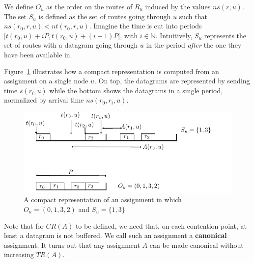 \documentclass[english]{article}
\begin{document}
We define $O_u$ as the order on the routes of $R_u$ induced by the values $ns(r,u)$. The set $S_u$ is defined as the set of routes going through $u$ such that $ns(r_0,r,u) < nt(r_0,r,u)$. Imagine the time is cut into periods $[t(r_0,u) + iP,t(r_0,u) + (i+1)P [$, with $i \in \mathbb{N}$. Intuitively, $S_u$ represents the set of routes with a datagram going through $u$ in the period \emph{after} the one they have been available in. 

Figure~\ref{fig:normalizedassignment} illustrates how a compact representation is computed from an assignment on a single node $u$. On top, the datagrams are represented by sending time $s(r_i,u)$ while the bottom shows the datagrams in a single period, normalized by arrival time $ns(r_0,r_i,u)$.  
\begin{figure}[!h]
	\centering
	\includegraphics[scale=1]{normalizedassignment}
\caption{A compact representation of an assignment in which $O_u = (0,1,3,2)$ and $S_u = \{1,3\}$ }
\label{fig:normalizedassignment}
\end{figure}


Note that for $CR(A)$ to be defined, we need that, on each contention point, at least a datagram is not buffered. We call such an assignment a \textbf{canonical} assignment. It turns out that any assignment $A$ can be made canonical without increasing $TR(A)$.
\end{document}
